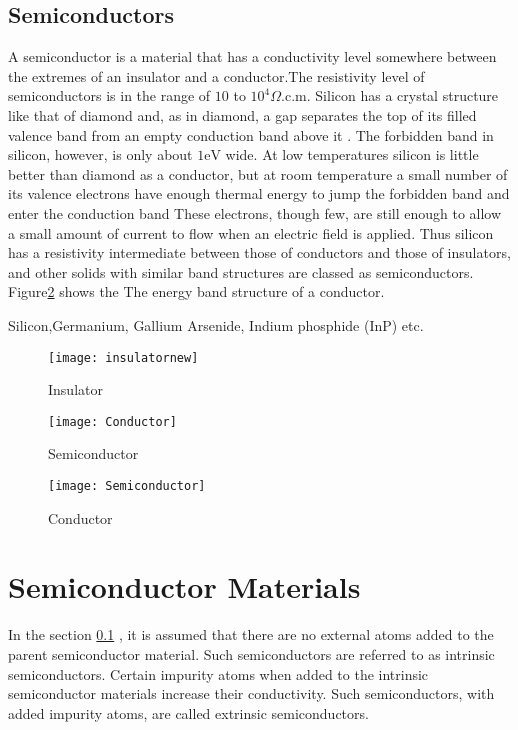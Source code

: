 \subsection{Semiconductors}\label{section-Semiconductors}
A semiconductor is a material that has a conductivity level somewhere between the extremes of an insulator and a conductor.The resistivity level of semiconductors
is in the range of $10$ to $10^{4} \Omega. \text{c.m}$.  Silicon has a crystal structure like that of diamond and, as in diamond, a gap separates the top of its filled valence band from an empty conduction band above it . The forbidden band in silicon, however, is only about $1 \mathrm{eV}$ wide. At low temperatures silicon is little better than diamond as a conductor, but at room temperature a small number of its valence electrons have enough thermal energy to jump the forbidden band and enter the conduction band  These electrons, though few, are still enough to allow a small amount of current to flow when an electric field is applied. Thus silicon has a resistivity intermediate between those of conductors and those of insulators, and other solids with similar band structures are classed as semiconductors. Figure\ref{Semiconductor} shows the The energy band structure of a conductor.
\begin{example}
	Silicon,Germanium, Gallium Arsenide, Indium phosphide (InP) etc.
\end{example}
\begin{minipage}{0.30\textwidth}
	\begin{figure}[H]
		\centering
		\texttt{[image: insulatornew]}
		\caption{Insulator}
		\label{Insulator}
		\end{figure}
\end{minipage}\hfill
\begin{minipage}{0.30\textwidth}
	\begin{figure}[H]
		\centering
		\texttt{[image: Conductor]}
	\caption{Semiconductor}
	\label{Semiconductor}
	\end{figure}
\end{minipage}\hfill
\begin{minipage}{0.30\textwidth}
	\begin{figure}[H]
		\centering
		\texttt{[image: Semiconductor]}
		\caption{Conductor}
		\label{Conductor}
	\end{figure}
\end{minipage}
\section{Semiconductor Materials}
In the section \ref{section-Semiconductors} , it is assumed that there are no external atoms added to the parent semiconductor material. Such semiconductors are referred to as intrinsic semiconductors. Certain impurity atoms when added to the intrinsic semiconductor materials increase their conductivity. Such semiconductors, with added impurity atoms, are called extrinsic semiconductors.
